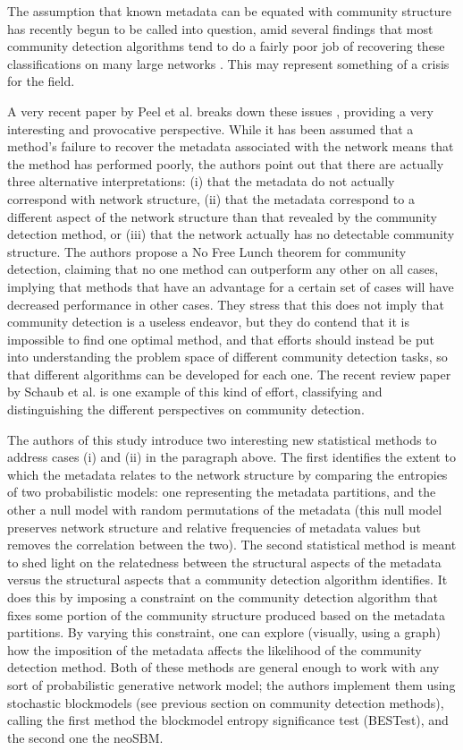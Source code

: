 The assumption that known metadata can be equated with community
structure has recently begun to be called into question, amid several
findings that most community detection algorithms tend to do a fairly
poor job of recovering these classifications on many large networks
\autocites{yang_defining_2015}{hric_community_2014}. This may represent
something of a crisis for the field.

A very recent paper by Peel et al. breaks down these issues
\autocite{peel_ground_2017}, providing a very interesting and
provocative perspective. While it has been assumed that a method's
failure to recover the metadata associated with the network means that
the method has performed poorly, the authors point out that there are
actually three alternative interpretations: (i) that the metadata do not
actually correspond with network structure, (ii) that the metadata
correspond to a different aspect of the network structure than that
revealed by the community detection method, or (iii) that the network
actually has no detectable community structure. The authors propose a No
Free Lunch theorem for community detection, claiming that no one method
can outperform any other on all cases, implying that methods that have
an advantage for a certain set of cases will have decreased performance
in other cases. They stress that this does not imply that community
detection is a useless endeavor, but they do contend that it is
impossible to find one optimal method, and that efforts should instead
be put into understanding the problem space of different community
detection tasks, so that different algorithms can be developed for each
one. The recent review paper by Schaub et al.
\autocite{schaub_many_2017} is one example of this kind of effort,
classifying and distinguishing the different perspectives on community
detection.

The authors of this study introduce two interesting new statistical
methods to address cases (i) and (ii) in the paragraph above. The first
identifies the extent to which the metadata relates to the network
structure by comparing the entropies of two probabilistic models: one
representing the metadata partitions, and the other a null model with
random permutations of the metadata (this null model preserves network
structure and relative frequencies of metadata values but removes the
correlation between the two). The second statistical method is meant to
shed light on the relatedness between the structural aspects of the
metadata versus the structural aspects that a community detection
algorithm identifies. It does this by imposing a constraint on the
community detection algorithm that fixes some portion of the community
structure produced based on the metadata partitions. By varying this
constraint, one can explore (visually, using a graph) how the imposition
of the metadata affects the likelihood of the community detection
method. Both of these methods are general enough to work with any sort
of probabilistic generative network model; the authors implement them
using stochastic blockmodels (see previous section on community
detection methods), calling the first method the blockmodel entropy
significance test (BESTest), and the second one the neoSBM.

